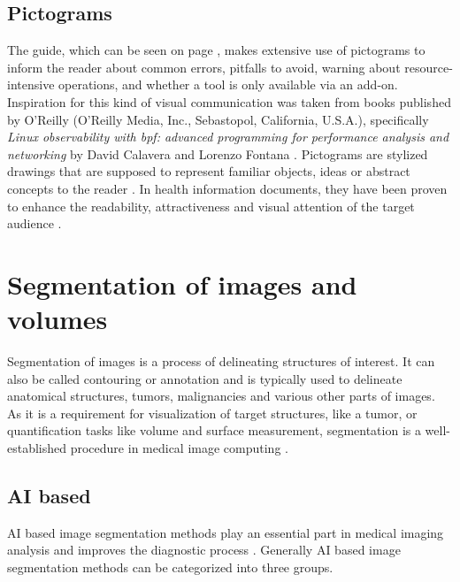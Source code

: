 \subsection{Pictograms}\label{s:b-pictograms}
The guide, which can be seen on page \pageref{a:guide}, makes extensive use of pictograms to inform the reader about common errors,
pitfalls to avoid, warning about resource-intensive operations, and whether a tool is only available via an add-on.
Inspiration for this kind of visual communication was taken from books published by O'Reilly (O'Reilly Media, Inc., Sebastopol, California, U.S.A.), specifically \textit{Linux observability with \acrshort{bpf}: advanced programming for performance analysis and networking} by David Calavera and Lorenzo Fontana \cite{calaveraLinuxObservabilityBPF2019}.
Pictograms are stylized drawings that are supposed to represent familiar objects, ideas or abstract concepts to the reader \cite{dowsePharmacistsAreWords2021}.
In health information documents, they have been proven to enhance the readability, attractiveness and visual attention of the target audience \cite{houtsRolePicturesImproving2006,mansoorEffectPictogramsReadability2003}.\\


\pagebreak
\section{Segmentation of images and volumes}\label{s:b-segmentation-basics}
Segmentation of images is a process of delineating structures of interest.
It can also be called contouring or annotation and is typically used to delineate anatomical structures, tumors,
malignancies and various other parts of images.
As it is a requirement for visualization of target structures, like a tumor, or quantification tasks like volume and surface measurement,
segmentation is a well-established procedure in medical image computing \cite{pinterPolymorphSegmentationRepresentation2019,slicercommunity3DSlicerImage2022}.

\subsection{AI based}\label{s:b-seg-ai}
AI based image segmentation methods play an essential part in medical imaging analysis and improves the diagnostic process \cite{qureshiMedicalImageSegmentation2023}.
Generally AI based image segmentation methods can be categorized into three groups.

